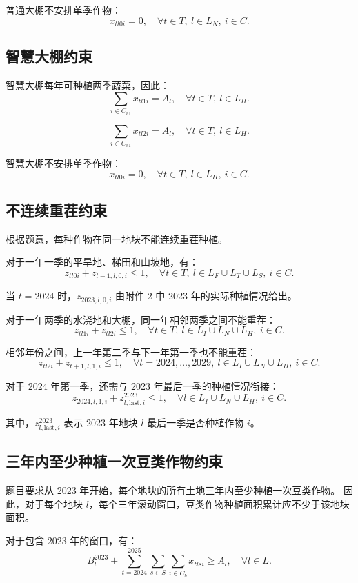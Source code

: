 \documentclass[12pt,a4paper]{ctexart}
\begin{document}
普通大棚不安排单季作物：
\[
x_{tl0i}=0,
\quad \forall t\in T,\ l\in L_N,\ i\in C.
\]

\subsection{智慧大棚约束}

智慧大棚每年可种植两季蔬菜，因此：
\[
\sum_{i\in C_{v1}}x_{tl1i}=A_l,
\quad \forall t\in T,\ l\in L_H.
\]

\[
\sum_{i\in C_{v1}}x_{tl2i}=A_l,
\quad \forall t\in T,\ l\in L_H.
\]

智慧大棚不安排单季作物：
\[
x_{tl0i}=0,
\quad \forall t\in T,\ l\in L_H,\ i\in C.
\]

\subsection{不连续重茬约束}

根据题意，每种作物在同一地块不能连续重茬种植。

对于一年一季的平旱地、梯田和山坡地，有：
\[
z_{tl0i}+z_{t-1,l,0,i}\leq 1,
\quad \forall t\in T,\ l\in L_F\cup L_T\cup L_S,\ i\in C.
\]

当 $t=2024$ 时，$z_{2023,l,0,i}$ 由附件 2 中 2023 年的实际种植情况给出。

对于一年两季的水浇地和大棚，同一年相邻两季之间不能重茬：
\[
z_{tl1i}+z_{tl2i}\leq 1,
\quad \forall t\in T,\ l\in L_I\cup L_N\cup L_H,\ i\in C.
\]

相邻年份之间，上一年第二季与下一年第一季也不能重茬：
\[
z_{tl2i}+z_{t+1,l,1,i}\leq 1,
\quad \forall t=2024,\ldots,2029,\ l\in L_I\cup L_N\cup L_H,\ i\in C.
\]

对于 2024 年第一季，还需与 2023 年最后一季的种植情况衔接：
\[
z_{2024,l,1,i}+z^{2023}_{l,\mathrm{last},i}\leq 1,
\quad \forall l\in L_I\cup L_N\cup L_H,\ i\in C.
\]

其中，$z^{2023}_{l,\mathrm{last},i}$ 表示 2023 年地块 $l$ 最后一季是否种植作物 $i$。

\subsection{三年内至少种植一次豆类作物约束}

题目要求从 2023 年开始，每个地块的所有土地三年内至少种植一次豆类作物。
因此，对于每个地块 $l$，每个三年滚动窗口，豆类作物种植面积累计应不少于该地块面积。

对于包含 2023 年的窗口，有：
\[
B^{2023}_l+
\sum_{t=2024}^{2025}
\sum_{s\in S}
\sum_{i\in C_b}
x_{tlsi}
\geq A_l,
\quad \forall l\in L.
\]
\end{document}
